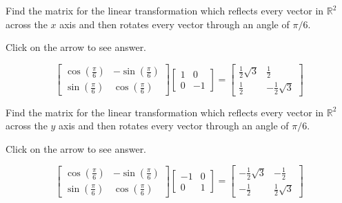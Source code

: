 \documentclass{ximera}
\begin{document}
\begin{problem}\label{prb:6.22} Find the matrix for the linear transformation which reflects every
vector in $\mathbb{R}^{2}$ across the $x$ axis and then rotates every vector
through an angle of $\pi /6$.

Click on the arrow to see answer.
\begin{expandable}
\[
\left[
\begin{array}{cc}
\cos \left( \frac{\pi }{6}\right)  & -\sin \left( \frac{\pi }{6}\right)  \\
\sin \left( \frac{\pi }{6}\right)  & \cos \left( \frac{\pi }{6}\right)
\end{array}
\right] \left[
\begin{array}{rr}
1 & 0 \\
0 & -1
\end{array}
\right] =  \left[
\begin{array}{cc}
\frac{1}{2}\sqrt{3} & \frac{1}{2} \\
\frac{1}{2} & -\frac{1}{2}\sqrt{3}
\end{array}
\right]
\]
\end{expandable}
\end{problem}

\begin{problem}\label{prb:6.23} Find the matrix for the linear transformation which reflects every
vector in $\mathbb{R}^{2}$ across the $y$ axis and then rotates every vector
through an angle of $\pi /6$.

Click on the arrow to see answer.
\begin{expandable}
\[
\left[
\begin{array}{cc}
\cos \left( \frac{\pi }{6}\right)  & -\sin \left( \frac{\pi }{6}\right)  \\
\sin \left( \frac{\pi }{6}\right)  & \cos \left( \frac{\pi }{6}\right)
\end{array}
\right] \left[
\begin{array}{rr}
-1 & 0 \\
0 & 1
\end{array}
\right] = \left[
\begin{array}{cc}
-\frac{1}{2}\sqrt{3} & -\frac{1}{2} \\
-\frac{1}{2} & \frac{1}{2}\sqrt{3}
\end{array}
\right]
\]
\end{expandable}
\end{problem}
\end{document}
